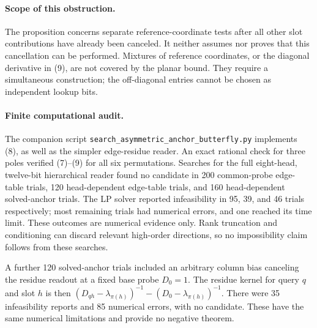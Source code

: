 \documentclass[11pt]{article}
\begin{document}
\paragraph{Scope of this obstruction.}
The proposition concerns separate reference-coordinate tests after
all other slot contributions have already been canceled. It neither
assumes nor proves that this cancellation can be performed. Mixtures
of reference coordinates, or the diagonal derivative in (9), are not
covered by the planar bound. They require a simultaneous construction;
the off-diagonal entries cannot be chosen as independent lookup bits.

\paragraph{Finite computational audit.}
The companion script
\texttt{search\_asymmetric\_anchor\_butterfly.py} implements (8), as
well as the simpler edge-residue reader. An exact rational check for
three poles verified (7)--(9) for all six permutations. Searches for
the full eight-head, twelve-bit hierarchical reader found no candidate
in 200 common-probe edge-table trials, 120 head-dependent edge-table
trials, and 160 head-dependent solved-anchor trials. The LP solver
reported infeasibility in 95, 39, and 46 trials respectively; most
remaining trials had numerical errors, and one reached its time limit.
These outcomes are numerical evidence only. Rank truncation and
conditioning can discard relevant high-order directions, so no
impossibility claim follows from these searches.

A further 120 solved-anchor trials included an arbitrary column bias
canceling the residue readout at a fixed base probe $D_0=1$.
The residue kernel for query $q$ and slot $h$ is then
$(D_{qh}-\lambda_{\pi(h)})^{-1}-(D_0-\lambda_{\pi(h)})^{-1}$.
There were 35 infeasibility reports and 85 numerical errors, with no
candidate. These have the same numerical limitations and provide no
negative theorem.
\end{document}
